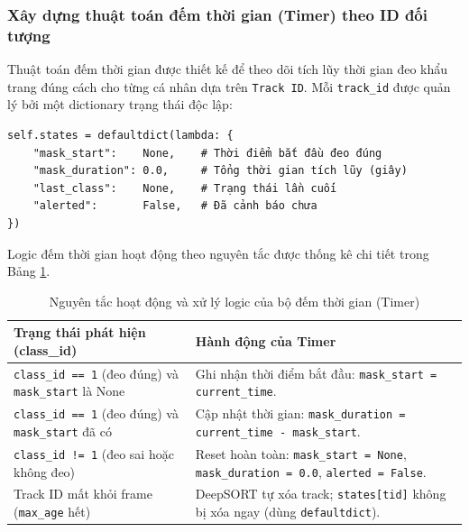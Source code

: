 \documentclass[a4paper,12pt]{article}
\begin{document}
\subsubsection{Xây dựng thuật toán đếm thời gian (Timer) theo ID đối tượng}

Thuật toán đếm thời gian được thiết kế để theo dõi tích lũy thời gian đeo khẩu trang đúng cách cho từng cá nhân dựa trên \texttt{Track ID}. Mỗi \texttt{track\_id} được quản lý bởi một dictionary trạng thái độc lập:

\begin{verbatim}
self.states = defaultdict(lambda: {
    "mask_start":    None,    # Thời điểm bắt đầu đeo đúng
    "mask_duration": 0.0,     # Tổng thời gian tích lũy (giây)
    "last_class":    None,    # Trạng thái lần cuối
    "alerted":       False,   # Đã cảnh báo chưa
})
\end{verbatim}

Logic đếm thời gian hoạt động theo nguyên tắc được thống kê chi tiết trong Bảng \ref{tab:timer_logic}.


\begin{table}[H]
\centering
\caption{Nguyên tắc hoạt động và xử lý logic của bộ đếm thời gian (Timer)}
\label{tab:timer_logic}
\renewcommand{\arraystretch}{1.5} 
\begin{tabularx}{\textwidth}{|>{\raggedright\arraybackslash}X|>{\raggedright\arraybackslash}X|}
\hline
\rowcolor{headerblue} 
\textbf{\color{white}Trạng thái phát hiện (class\_id)} & \textbf{\color{white}Hành động của Timer} \\ \hline
\texttt{class\_id == 1} (đeo đúng) và \texttt{mask\_start} là None & Ghi nhận thời điểm bắt đầu: \texttt{mask\_start = current\_time}. \\ \hline
\texttt{class\_id == 1} (đeo đúng) và \texttt{mask\_start} đã có & Cập nhật thời gian: \texttt{mask\_duration = current\_time - mask\_start}. \\ \hline
\texttt{class\_id != 1} (đeo sai hoặc không đeo) & Reset hoàn toàn: \texttt{mask\_start = None}, \texttt{mask\_duration = 0.0}, \texttt{alerted = False}. \\ \hline
Track ID mất khỏi frame (\texttt{max\_age} hết) & DeepSORT tự xóa track; \texttt{states[tid]} không bị xóa ngay (dùng \texttt{defaultdict}). \\ \hline
\end{tabularx} 
\end{table}
\end{document}
